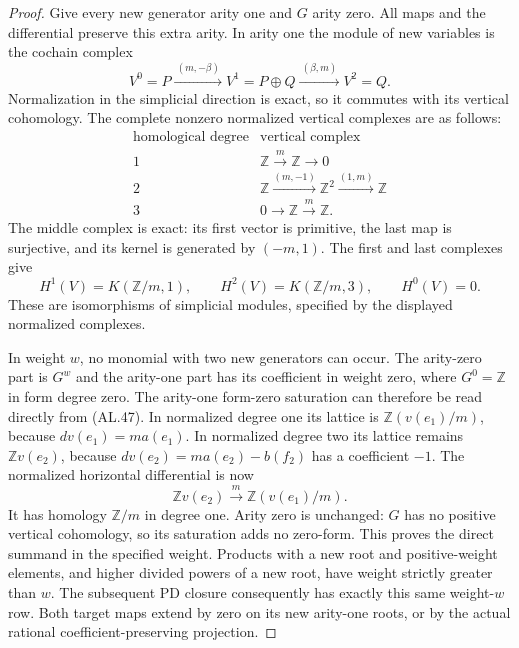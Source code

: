 \begin{proof}
Give every new generator arity one and $G$ arity
zero.  All maps and the differential preserve
this extra arity.  In arity one the module of
new variables is the cochain complex
\[
 V^0=P\xrightarrow{\ (m,-\beta)\ }
 V^1=P\oplus Q\xrightarrow{\ (\beta,m)\ }V^2=Q.
 \tag{AL.46}
\]
Normalization in the simplicial direction is exact,
so it commutes with its vertical cohomology.
The complete nonzero normalized vertical complexes
are as follows:
\[
\begin{array}{c|c}
\text{homological degree}&\text{vertical complex}\\\hline
1&\mathbb Z\xrightarrow{m}\mathbb Z\longrightarrow0\\
2&\mathbb Z\xrightarrow{(m,-1)}\mathbb Z^2
                         \xrightarrow{(1,m)}\mathbb Z\\
3&0\longrightarrow\mathbb Z\xrightarrow{m}\mathbb Z.
\end{array}
 \tag{AL.47}
\]
The middle complex is exact: its first vector is
primitive, the last map is surjective, and its
kernel is generated by $(-m,1)$.
The first and last complexes give
\[
 H^1(V)=K(\mathbb Z/m,1),\qquad
 H^2(V)=K(\mathbb Z/m,3),\qquad H^0(V)=0.
 \tag{AL.48}
\]
These are isomorphisms of simplicial modules, specified
by the displayed normalized complexes.

In weight $w$, no monomial with two new generators
can occur.  The arity-zero part is $G^w$ and the
arity-one part has its coefficient in weight zero,
where $G^0=\mathbb Z$ in form degree zero.
The arity-one form-zero saturation can therefore be
read directly from \textup{(AL.47)}.
In normalized degree one its lattice is
$\mathbb Z(v(e_1)/m)$, because $dv(e_1)=m a(e_1)$.
In normalized degree two its lattice remains
$\mathbb Z v(e_2)$, because
$dv(e_2)=m a(e_2)-b(f_2)$ has a coefficient $-1$.
The normalized horizontal differential is now
\[
 \mathbb Z v(e_2)\xrightarrow{\ m\ }
                \mathbb Z(v(e_1)/m).
 \tag{AL.49}
\]
It has homology $\mathbb Z/m$ in degree one.
Arity zero is unchanged: $G$ has no positive
vertical cohomology, so its saturation adds no
zero-form.  This proves the direct summand in the
specified weight.  Products with a new root and
positive-weight elements, and higher divided powers
of a new root, have weight strictly greater than
$w$.  The subsequent PD closure consequently has
exactly this same weight-$w$ row.  Both target maps
extend by zero on its new arity-one roots, or by
the actual rational coefficient-preserving projection.


\end{proof}
